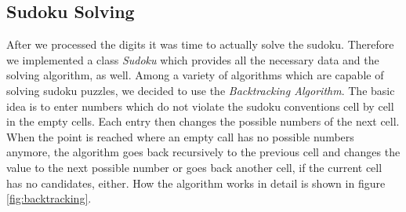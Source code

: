 \documentclass[
a4paper,     %
12pt         %
]{scrartcl}  %
\begin{document}
\subsection{Sudoku Solving}
After we processed the digits it was time to actually solve the sudoku. Therefore we 
implemented a class \emph{Sudoku} which provides all the necessary data and the solving 
algorithm, as well. Among a variety of algorithms which are capable of solving sudoku puzzles,
we decided to use the \emph{Backtracking Algorithm}. The basic idea is to enter numbers which
do not violate the sudoku conventions cell by cell in the empty cells. Each entry then changes
the possible numbers of the next cell. When the point is reached where an empty call has no 
possible numbers anymore, the algorithm goes back recursively to the previous cell and changes the value to
the next possible number or goes back another cell, if the current cell has no candidates, either.
How the algorithm works in detail is shown in figure \ref{fig:backtracking}.
\end{document}
